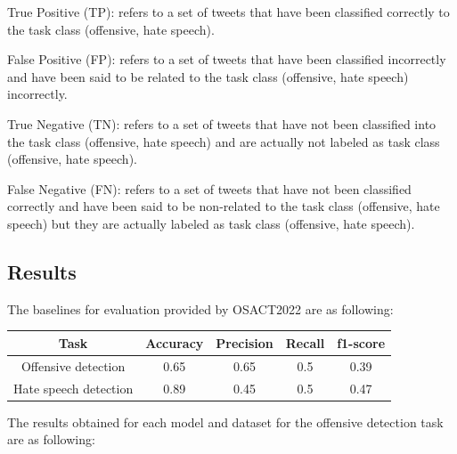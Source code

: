 \documentclass[10pt, a4paper, twoside, twocolumn]{article}
\begin{document}
True Positive (TP): refers to a set of tweets that have been classified correctly to the task class (offensive, hate speech).


False Positive (FP): refers to a set of tweets that have been classified incorrectly and have been said to be related to the task class (offensive, hate speech) incorrectly.


True Negative (TN): refers to a set of tweets that have not been classified into the task class (offensive, hate speech) and are actually not labeled as task class (offensive, hate speech).


False Negative (FN): refers to a set of tweets that have not been classified correctly and have been said to be non-related to the task class (offensive, hate speech) but they are actually labeled as task class (offensive, hate speech).

\clearpage
\onecolumn

\subsection{Results}

The baselines for evaluation provided by OSACT2022 are as following:

\begin{table}[htbp]
	\begin{center}
		\begin{tabular}{|c|c|c|c|c|}
			\hline
			Task & Accuracy & Precision & Recall & f1-score \\ \hline
			Offensive detection & 0.65 & 0.65 & 0.5 & 0.39 \\ %
			Hate speech detection & 0.89 & 0.45 & 0.5 & 0.47 \\ \hline
		\end{tabular}
	\end{center}
\end{table}

The results obtained for each model and dataset for the offensive detection task are as following:
\end{document}
